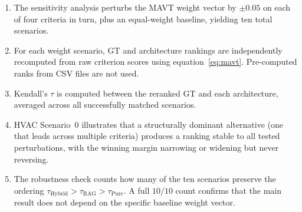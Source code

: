 \documentclass[11pt]{article}
\begin{document}
\begin{enumerate}
  \item The sensitivity analysis perturbs the MAVT weight vector by $\pm 0.05$
        on each of four criteria in turn, plus an equal-weight baseline,
        yielding ten total scenarios.
  \item For each weight scenario, GT and architecture rankings are independently
        recomputed from raw criterion scores using equation~\eqref{eq:mavt}.
        Pre-computed ranks from CSV files are not used.
  \item Kendall's $\tau$ is computed between the reranked GT and each
        architecture, averaged across all successfully matched scenarios.
  \item HVAC Scenario~0 illustrates that a structurally dominant alternative
        (one that leads across multiple criteria) produces a ranking stable
        to all tested perturbations, with the winning margin narrowing or
        widening but never reversing.
  \item The robustness check counts how many of the ten scenarios preserve
        the ordering $\tau_{\text{Hybrid}} > \tau_{\text{RAG}} > \tau_{\text{Pure}}$.
        A full $10/10$ count confirms that the main result does not depend on
        the specific baseline weight vector.
\end{enumerate}
\end{document}
